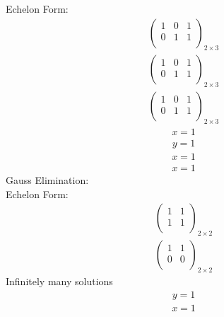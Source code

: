 \documentclass{article}
\begin{document}
Echelon Form:\\
\begin{align*}
\left(
\begin{array}{cc|c}
1 & 0 & 1\\
0 & 1 & 1\\
\end{array}
\right)_{2\times 3}
\end{align*}
\begin{align*}
\left(
\begin{array}{cc|c}
1 & 0 & 1\\
0 & 1 & 1\\
\end{array}
\right)_{2\times 3}
\end{align*}
\begin{align*}
\left(
\begin{array}{cc|c}
1 & 0 & 1\\
0 & 1 & 1\\
\end{array}
\right)_{2\times 3}
\end{align*}
\begin{align*}
x=1\end{align*}
\begin{align*}
y=1\end{align*}
\begin{align*}
x=1\end{align*}
\begin{align*}
x=1\end{align*}
Gauss Elimination:\\
Echelon Form:\\
\begin{align*}
\left(
\begin{array}{c|c}
1 & 1\\
1 & 1\\
\end{array}
\right)_{2\times 2}
\end{align*}
\begin{align*}
\left(
\begin{array}{c|c}
1 & 1\\
0 & 0\\
\end{array}
\right)_{2\times 2}
\end{align*}
Infinitely many solutions\\
\begin{align*}
y=1\end{align*}
\begin{align*}
x=1\end{align*}
\end{document}
